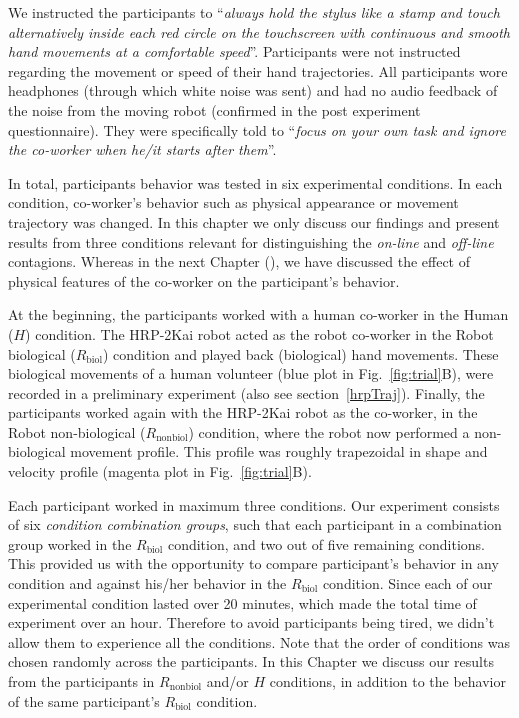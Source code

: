We instructed the participants to ``{\it always hold the stylus like a stamp and touch alternatively inside each red circle on the touchscreen with continuous and smooth hand movements at a comfortable speed}''. Participants were not instructed regarding the movement or speed of their hand trajectories. All participants wore headphones (through which white noise was sent) and had no audio feedback of the noise from the moving robot (confirmed in the post experiment questionnaire). They were specifically told to ``{\it focus on your own task and ignore the co-worker when he/it starts after them}''.

In total, participants behavior was tested in six experimental conditions. In each condition, co-worker's behavior such as physical appearance or movement trajectory was changed. In this chapter we only discuss our findings and present results from three conditions relevant for distinguishing the \textit{on-line} and \textit{off-line} contagions. Whereas in the next Chapter (), we have discussed the effect of physical features of the co-worker on the participant's behavior. 

At the beginning, the participants worked with a human co-worker in the Human ($H$) condition. The HRP-2Kai robot acted as the robot co-worker in the Robot biological ($R_{\text{biol}}$) condition and played back (biological) hand movements. These biological movements of a human volunteer (blue plot in Fig.~\ref{fig:trial}B), were recorded in a preliminary experiment (also see section~\ref{hrpTraj}). Finally, the participants worked again with the HRP-2Kai robot as the co-worker, in the Robot non-biological ($R_{\text{nonbiol}}$) condition, where the robot now performed a non-biological movement profile. This profile was roughly trapezoidal in shape and velocity profile (magenta plot in Fig.~\ref{fig:trial}B). 

Each participant worked in maximum three conditions. Our experiment consists of six \emph{condition combination groups}, such that each participant in a combination group worked in the $R_{\text{biol}}$ condition, and two out of five remaining conditions. This provided us with the opportunity to compare participant's behavior in any condition and against his/her behavior in the $R_{\text{biol}}$ condition. Since each of our experimental condition lasted over 20 minutes, which made the total time of experiment over an hour. Therefore to avoid participants being tired, we didn't allow them to experience all the conditions. Note that the order of conditions was chosen randomly across the participants. In this Chapter we discuss our results from the participants in $R_{\text{nonbiol}}$ and/or $H$ conditions, in addition to the behavior of the same participant's $R_{\text{biol}}$ condition.

